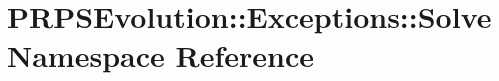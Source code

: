 \hypertarget{namespace_p_r_p_s_evolution_1_1_exceptions_1_1_solve}{\section{\-P\-R\-P\-S\-Evolution\-:\-:\-Exceptions\-:\-:\-Solve \-Namespace \-Reference}
\label{namespace_p_r_p_s_evolution_1_1_exceptions_1_1_solve}
}
